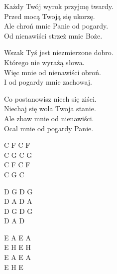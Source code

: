 \begin{text}

    Każdy Twój wyrok przyjmę twardy.\\
    Przed mocą Twoją się ukorzę.\\
    Ale chroń mnie Panie od pogardy.\\
    Od nienawiści strzeż mnie Boże.

    Wszak Tyś jest niezmierzone dobro.\\
    Którego nie wyrażą słowa.\\
    Więc mnie od nienawiści obroń.\\
    I od pogardy mnie zachowaj.

    Co postanowisz niech się ziści.\\
    Niechaj się wola Twoja stanie.\\
    Ale zbaw mnie od nienawiści.\\
    Ocal mnie od pogardy Panie.

\end{text}
\begin{chord}

    C F C F\\
    C G C G\\
    C F C F\\
    C G C

    D G D G\\
    D A D A\\
    D G D G\\
    D A D

    E A E A\\
    E H E H\\
    E A E A\\
    E H E

\end{chord}